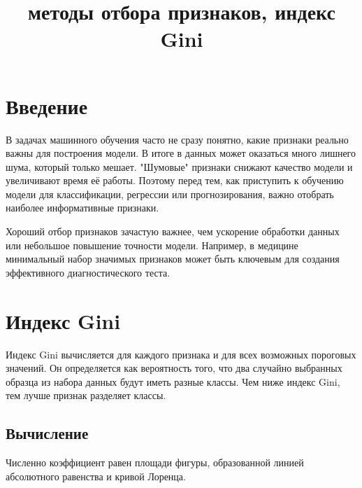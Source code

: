 \documentclass{article}
\begin{document}
\title{методы отбора признаков, индекс Gini}
\author{}
\date{}
\maketitle

\section*{Введение}
В задачах машинного обучения часто не сразу понятно, какие признаки реально важны для построения модели. В итоге в данных может оказаться много лишнего шума, который только мешает. "Шумовые" признаки снижают качество модели и увеличивают время её работы. Поэтому перед тем, как приступить к обучению модели для классификации, регрессии или прогнозирования, важно отобрать наиболее информативные признаки.

Хороший отбор признаков зачастую важнее, чем ускорение обработки данных или небольшое повышение точности модели. Например, в медицине минимальный набор значимых признаков может быть ключевым для создания эффективного диагностического теста.

\section*{Индекс Gini}
Индекс Gini вычисляется для каждого признака и для всех возможных пороговых значений. Он определяется как вероятность того, что два случайно выбранных образца из набора данных будут иметь разные классы. Чем ниже индекс Gini, тем лучше признак разделяет классы.

\subsection*{Вычисление}

Численно коэффициент равен площади фигуры, образованной линией абсолютного равенства и кривой Лоренца. 
\end{document}

